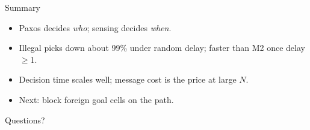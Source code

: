 \documentclass[aspectratio=169,10pt]{beamer}
\begin{document}
\begin{frame}{Summary}
\begin{itemize}
\item Paxos decides \emph{who}; sensing decides \emph{when}.
\item Illegal picks down about 99\% under random delay; faster than M2 once delay $\geq$1.
\item Decision time scales well; message cost is the price at large $N$.
\item Next: block foreign goal cells on the path.
\end{itemize}
\centering\Large Questions?
\end{frame}
\end{document}
